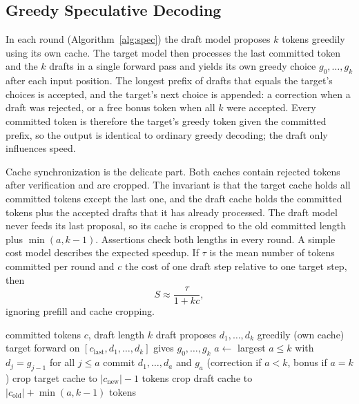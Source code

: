 \documentclass[conference]{IEEEtran}
\begin{document}
\subsection{Greedy Speculative Decoding}
In each round (Algorithm~\ref{alg:spec}) the draft model proposes $k$ tokens greedily using its own cache. The target model then processes the last committed token and the $k$ drafts in a single forward pass and yields its own greedy choice $g_0,\dots,g_k$ after each input position. The longest prefix of drafts that equals the target's choices is accepted, and the target's next choice is appended: a correction when a draft was rejected, or a free bonus token when all $k$ were accepted. Every committed token is therefore the target's greedy token given the committed prefix, so the output is identical to ordinary greedy decoding; the draft only influences speed.

Cache synchronization is the delicate part. Both caches contain rejected tokens after verification and are cropped. The invariant is that the target cache holds all committed tokens except the last one, and the draft cache holds the committed tokens plus the accepted drafts that it has already processed. The draft model never feeds its last proposal, so its cache is cropped to the old committed length plus $\min(a,k-1)$. Assertions check both lengths in every round. A simple cost model describes the expected speedup. If $\tau$ is the mean number of tokens committed per round and $c$ the cost of one draft step relative to one target step, then
\begin{equation}
S \approx \frac{\tau}{1+kc},
\label{eq:cost}
\end{equation}
ignoring prefill and cache cropping.

\begin{algorithm}[!t]
\caption{One round of greedy speculative decoding}
\label{alg:spec}
\small
\begin{algorithmic}[1]
\Require committed tokens $c$, draft length $k$
\State draft proposes $d_1,\dots,d_k$ greedily (own cache)
\State target forward on $[c_{\text{last}},d_1,\dots,d_k]$ gives $g_0,\dots,g_k$
\State $a\gets$ largest $a\le k$ with $d_j=g_{j-1}$ for all $j\le a$
\State commit $d_1,\dots,d_a$ and $g_a$ (correction if $a<k$, bonus if $a=k$)
\State crop target cache to $|c_{\text{new}}|-1$ tokens
\State crop draft cache to $|c_{\text{old}}|+\min(a,k-1)$ tokens
\end{algorithmic}
\end{algorithm}
\end{document}
